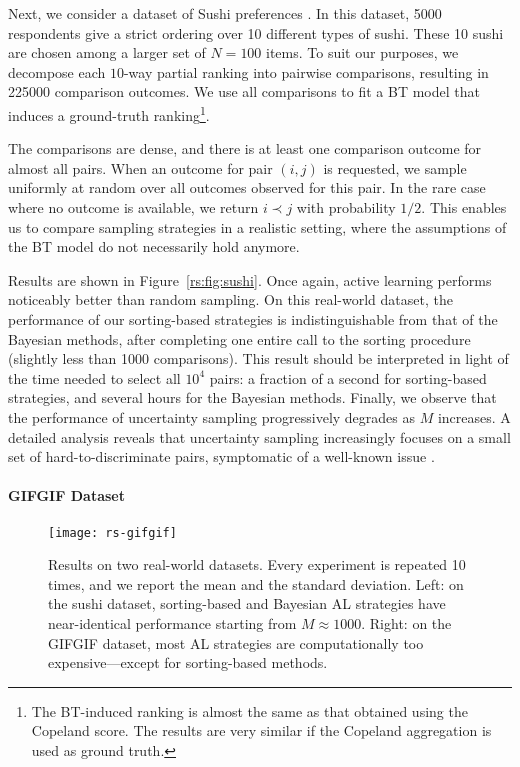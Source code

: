 Next, we consider a dataset of Sushi preferences \citep{kamishima2009efficient}.
In this dataset, \num{5000} respondents give a strict ordering over \num{10} different types of sushi.
These \num{10} sushi are chosen among a larger set of $N = \num{100}$ items.
To suit our purposes, we decompose each $10$-way partial ranking into pairwise comparisons, resulting in \num{225000} comparison outcomes.
We use all comparisons to fit a BT model that induces a ground-truth ranking\footnote{
The BT-induced ranking is almost the same as that obtained using the Copeland score.
The results are very similar if the Copeland aggregation is used as ground truth.}.

The comparisons are dense, and there is at least one comparison outcome for almost all pairs.
When an outcome for pair $(i,j)$ is requested, we sample uniformly at random over all outcomes observed for this pair.
In the rare case where no outcome is available, we return $i \prec j$ with probability $1/2$.
This enables us to compare sampling strategies in a realistic setting, where the assumptions of the BT model do not necessarily hold anymore.

Results are shown in Figure~\ref{rs:fig:sushi}.
Once again, active learning performs noticeably better than random sampling.
On this real-world dataset, the performance of our sorting-based strategies is indistinguishable from that of the Bayesian methods, after completing one entire call to the sorting procedure (slightly less than \num{1000} comparisons).
This result should be interpreted in light of the time needed to select all $10^4$ pairs: a fraction of a second for sorting-based strategies, and several hours for the Bayesian methods.
Finally, we observe that the performance of uncertainty sampling progressively degrades as $M$ increases.
A detailed analysis reveals that uncertainty sampling increasingly focuses on a small set of hard-to-discriminate pairs, symptomatic of a well-known issue \citep{settles2012active}.


\paragraph{GIFGIF Dataset}

\begin{figure}[t]
\centering
\texttt{[image: rs-gifgif]}
\caption{
Results on two real-world datasets.
Every experiment is repeated \num{10} times, and we report the mean and the standard deviation.
Left: on the sushi dataset, sorting-based and Bayesian AL strategies have near-identical performance starting from $M \approx \num{1000}$.
Right: on the GIFGIF dataset, most AL strategies are computationally too expensive---except for sorting-based methods.
}
\label{rs:fig:gifgif}
\end{figure}


